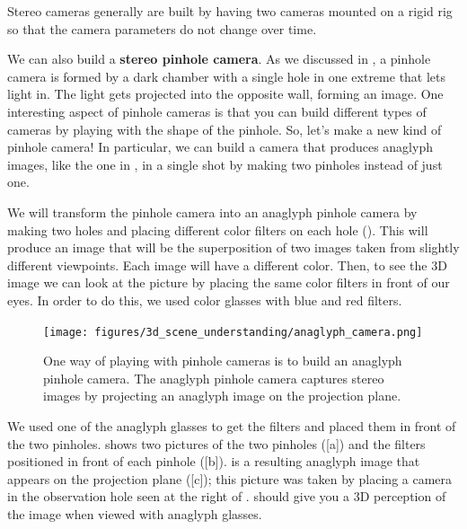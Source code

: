 Stereo cameras generally are built by having two cameras mounted on a rigid rig so that the camera parameters do not change over time. 

We can also build a {\bf stereo pinhole camera}.
As we discussed in \chap{\ref{chapter:imaging}}, a pinhole camera is formed by a dark chamber with a single hole in one extreme that lets light in. The light gets projected into the opposite wall, forming an image. One interesting aspect of pinhole cameras is that you can build different types of cameras by playing with the shape of the pinhole. So, let's make a new kind of pinhole camera! In particular, we can build a camera that produces anaglyph images, like the one in \fig{\ref{fig:titanic}}, in a single shot by making two pinholes instead of just one.

We will transform the pinhole camera into an anaglyph pinhole camera by making two holes and placing different color filters on each hole (\fig{\ref{fig:anaglyph}}). This will produce an image that will be the superposition of two images taken from slightly different viewpoints. Each image will have a different color. Then, to see the 3D image we can look at the picture by placing the same color filters in front of our eyes. In order to do this, we used color glasses with blue and red filters.

\begin{figure}
\centerline{
\texttt{[image: figures/3d\_scene\_understanding/anaglyph\_camera.png]}
}
\caption{One way of playing with pinhole cameras is to build an anaglyph pinhole camera. The anaglyph pinhole camera captures stereo images by projecting an anaglyph image on the projection plane.}
\label{fig:anaglyph}
\end{figure}

We used one of the anaglyph glasses to get the filters and placed them in front of the two pinholes. \Fig{\ref{fig:anaglyph}} shows two pictures of the two pinholes (\fig{\ref{fig:anaglyph}}[a]) and the filters positioned in front of each pinhole (\fig{\ref{fig:anaglyph}}[b]).  is a resulting anaglyph image that appears on the projection plane 
(\fig{\ref{fig:anaglyph}}[c]); this picture was taken by placing a camera in the observation hole seen at the right of .  should give you a 3D perception of the image when viewed with anaglyph glasses.

